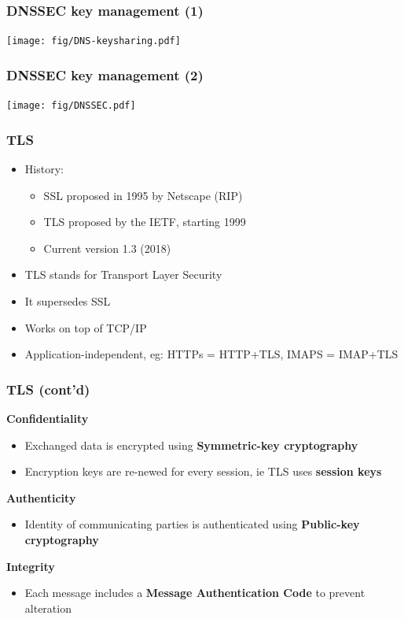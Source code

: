 \documentclass[
hyperref={pdfpagelabels=false}
,xcolor=table
]
{beamer}
\begin{document}
\begin{frame}
  \frametitle{DNSSEC key management (1)}

  \begin{center}
    \texttt{[image: fig/DNS-keysharing.pdf]}
  \end{center}
   
\end{frame}



\begin{frame}
  \frametitle{DNSSEC key management (2)}


  \begin{center}
    \texttt{[image: fig/DNSSEC.pdf]}
  \end{center}
   
\end{frame}


\begin{frame}
  \frametitle{TLS}
  \begin{itemize}
  \item History:
    \begin{itemize}
    \item SSL proposed in 1995 by Netscape (RIP)
    \item TLS proposed by the IETF, starting 1999
    \item Current version 1.3 (2018)
    \end{itemize}
  \item TLS stands for Transport Layer Security
  \item It supersedes SSL 
  \item Works on top of TCP/IP
  \item Application-independent, eg: HTTPs = HTTP+TLS, IMAPS = IMAP+TLS
  \end{itemize}
\end{frame}

\begin{frame}
  \frametitle{TLS (cont'd)}

  \textbf{Confidentiality}
  \begin{itemize}
  \item Exchanged data is encrypted using \textbf{Symmetric-key cryptography}
  \item Encryption keys are re-newed for every session, ie TLS uses \textbf{session keys}
  \end{itemize}

  \textbf{Authenticity}
  \begin{itemize}
  \item Identity of communicating parties is authenticated using \textbf{Public-key cryptography}
  \end{itemize}

  \textbf{Integrity}
  \begin{itemize}
  \item Each message includes a \textbf{Message Authentication Code} to prevent alteration
  \end{itemize}
\end{frame}
\end{document}
